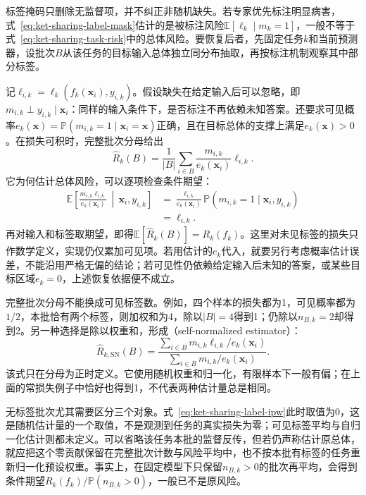 标签掩码只删除无监督项，并不纠正非随机缺失。若专家优先标注明显病害，式~\eqref{eq:ket-sharing-label-mask}估计的是被标注风险$\mathbb E[\ell_k\mid m_k=1]$，一般不等于式~\eqref{eq:ket-sharing-task-risk}中的总体风险。要恢复后者，先固定任务$k$和当前预测器，设批次$B$从该任务的目标输入总体独立同分布抽取，再按标注机制观察其中部分标签。

记$\ell_{i,k}=\ell_k(f_k(\bm x_i),y_{i,k})$。假设缺失在给定输入后可以忽略，即$m_{i,k}\perp y_{i,k}\mid\bm x_i$：同样的输入条件下，是否标注不再依赖未知答案。还要求可见概率$e_k(\bm x)=\mathbb P(m_{i,k}=1\mid\bm x_i=\bm x)$正确，且在目标总体的支撑上满足$e_k(\bm x)>0$。在损失可积时，完整批次分母给出
\begin{equation}
  \widehat R_k(B)=\frac{1}{|B|}
    \sum_{i\in B}\frac{m_{i,k}}{e_k(\bm x_i)}\ell_{i,k}.
  \label{eq:ket-sharing-label-ipw}
\end{equation}
它为何估计总体风险，可以逐项检查条件期望：
\begin{align}
  \mathbb E\!\left[
    \frac{m_{i,k}\ell_{i,k}}{e_k(\bm x_i)}
    \,\middle|\,\bm x_i,y_{i,k}\right]
  &=\frac{\ell_{i,k}}{e_k(\bm x_i)}
    \mathbb P(m_{i,k}=1\mid\bm x_i,y_{i,k})
  \nonumber\\
  &=\ell_{i,k}.
  \label{eq:ket-sharing-label-ipw-expectation}
\end{align}
再对输入和标签取期望，即得$\mathbb E[\widehat R_k(B)]=R_k(f_k)$。这里对未见标签的损失只作数学定义，实现仍仅累加可见项。若用估计的$e_k$代入，就要另行考虑概率估计误差，不能沿用严格无偏的结论；若可见性仍依赖给定输入后未知的答案，或某些目标区域$e_k=0$，上述恢复依据便不成立。

完整批次分母不能换成可见标签数。例如，四个样本的损失都为1，可见概率都为$1/2$，本批恰有两个标签，则加权和为4，除以$|B|=4$得到1；仍除以$n_{B,k}=2$却得到2。另一种选择是除以权重和，形成（self-normalized estimator）：
\begin{equation}
  \widehat R_{k,\mathrm{SN}}(B)
  =\frac{\sum_{i\in B}m_{i,k}\ell_{i,k}/e_k(\bm x_i)}
    {\sum_{i\in B}m_{i,k}/e_k(\bm x_i)}.
  \label{eq:ket-sharing-label-self-normalized}
\end{equation}
该式只在分母为正时定义。它使用随机权重和归一化，有限样本下一般有偏；在上面的常损失例子中恰好也得到1，不代表两种估计量总是相同。

无标签批次尤其需要区分三个对象。式~\eqref{eq:ket-sharing-label-ipw}此时取值为0，这是随机估计量的一个取值，不是观测到任务的真实损失为零；可见标签平均与自归一化估计则都未定义。可以省略该任务本批的监督反传，但若仍声称估计原总体，就应把这个零贡献保留在完整批次计数与风险平均中，也不按本批有标签的任务重新归一化预设权重。事实上，在固定模型下只保留$n_{B,k}>0$的批次再平均，会得到条件期望$R_k(f_k)/\mathbb P(n_{B,k}>0)$，一般已不是原风险。

